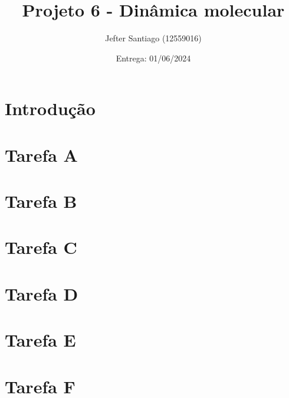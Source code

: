 \documentclass[a4paper, 13pt]{article}
\title{\color{blue}Projeto 6 - Dinâmica molecular}
\author{Jefter Santiago (12559016)}
\date{Entrega: 01/06/2024}
\begin{document}
\maketitle
\section{Introdução}


\section{Tarefa A}

\section{Tarefa B}

\section{Tarefa C}

\section{Tarefa D}

\section{Tarefa E}

\section{Tarefa F}



\nocite{*}
\printbibliography[title = Referências]
\end{document}
